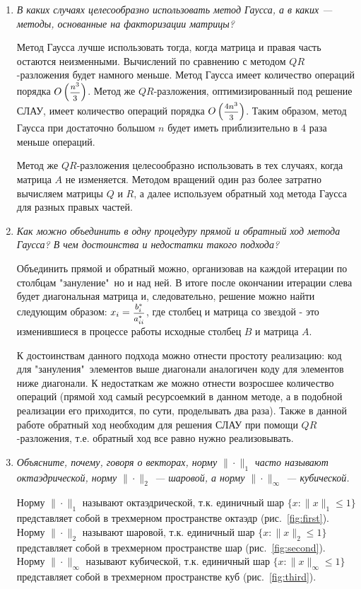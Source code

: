 \documentclass[12pt, a4paper]{article}
\begin{document}
\begin{enumerate}
	\item \textit{В каких случаях целесообразно использовать метод Гаусса, а в каких --- методы, основанные на факторизации матрицы?}
	
	\smallskip
	Метод Гаусса лучше использовать тогда, когда матрица и правая часть остаются неизменными. Вычислений по сравнению с методом $QR$-разложения будет намного меньше.
	Метод Гаусса имеет количество операций порядка $O\left(\hbox{\footnotesize$\displaystyle\frac{n^3}{3}$}\right)$. Метод же $QR$-разложения, оптимизированный под решение СЛАУ, имеет количество операций порядка $O\left(\hbox{\footnotesize$\displaystyle\frac{4n^3}{3}$}\right)$. Таким образом, метод Гаусса при достаточно большом $n$ будет иметь приблизительно в 4 раза меньше операций.
	
	Метод же $QR$-разложения целесообразно использовать в тех случаях, когда матрица $A$ не изменяется. Методом вращений один раз более затратно вычисляем матрицы $Q$ и $R$, а далее используем обратный ход метода Гаусса для разных правых частей.
	\smallskip	
		\item \textit{Как можно объединить в одну процедуру прямой и обратный ход метода Гаусса? В чем достоинства и недостатки такого подхода?}
		
		\smallskip
		Объединить прямой и обратный можно, организовав на каждой итерации по столбцам "зануление"\,  но и над ней. В итоге после окончании итерации слева будет диагональная матрица и, следовательно, решение можно найти следующим образом: $x_i = \hbox{\footnotesize$\displaystyle\frac{b^*_i}{a^*_{ii}}$}$, где столбец и матрица со звездой - это изменившиеся в процессе работы исходные столбец $B$ и матрица $A$.
		
		К достоинствам данного подхода можно отнести простоту реализацию: код для "зануления"\, элементов выше диагонали аналогичен коду для элементов ниже диагонали. К недостаткам же можно отнести возросшее количество операций (прямой ход самый ресурсоемкий в данном методе, а в подобной реализации его приходится, по сути, проделывать два раза). Также в данной работе обратный ход необходим для решения СЛАУ при помощи $QR$-разложения, т.е. обратный ход все равно нужно реализовывать.
		\smallskip
		
		\item \textit{Объясните, почему, говоря о векторах, норму $\|\cdot\|_1$ часто
			называют октаэдрической, норму $\|\cdot\|_2$ — шаровой, а норму $\|\cdot\|_\infty$ — кубической.}
		\smallskip
		
		Норму $\|\cdot\|_1$ называют октаэдрической, т.к. единичный шар ${\{ x: \|x\|_1 \leq 1\}}$ представляет собой в трехмерном пространстве октаэдр (рис.~\ref{fig:first}). Норму $\|\cdot\|_2$ называют шаровой, т.к. единичный шар $\{ x: \|x\|_2 \leq 1\}$ представляет собой в трехмерном пространстве шар (рис.~\ref{fig:second}). Норму $\|\cdot\|_{\infty}$ называют кубической, т.к. единичный шар $\{ x: \|x\|_{\infty} \leq 1\}$ представляет собой в трехмерном пространстве куб (рис.~\ref{fig:third}).
		

\end{enumerate}
\end{document}
